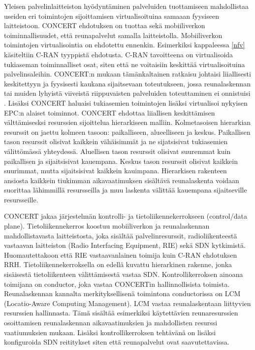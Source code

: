 Yleisen palvelinlaitteiston hyödyntäminen palveluiden tuottamiseen mahdollistaa useiden eri toimintojen sijoittamisen virtualisoituina samaaan fyysiseen laitteistoon.
CONCERT ehdotuksen on tuottaa sekä mobiiliverkon toiminnallisuudet, että reunapalvelut samalla laitteistolla. 
Mobiiliverkon toimintojen virtualisointia on ehdotettu ennenkin. Esimerkiksi kappaleessa \ref{nfv} käsiteltiin C-RAN tyyppistä ehdotusta. C-RAN tavoitteena on virtualisoida tukiaseman toiminnalliset osat, siten että ne voitaisiin keskittää virtualisoituina palvelinsaleihin. 
CONCERT:n mukaan tämänkaltainen ratkaisu johtaisi liiallisesti keskitettyyn ja fyysisesti kaukana sijaitsevaan toteutukseen, jossa reunalaskennan tai muiden lyhyistä viiveistä riippuvaisten palveluiden toteuttaminen ei onnistuisi \cite{liu2014concert}. Lisäksi CONCERT haluaisi tukiasemien toimintojen lisäksi virtualisoi nykyisen EPC:n alaiset toiminnot.
CONCERT ehdottaa liiallisen keskittämisen välttämisesksi resurssien sijoittelua hierarkiseen malliin.
Kolmetasoisen hierarkian resurssit on jaettu kolmeen tasoon: paikalliseen, alueelliseen ja keskus. 
Paikallisen tason resurssit olisivat kaikkein vähäisimmät ja ne sijatsisivat tukiasemien välittömässä yhteydessä.
Aluellisen tason resurssit olisivat suuremmat kuin paikallisen ja sijaitsisivat kauempana.
Keskus tason resurssit olisivat kaikkein suurimmat, mutta sijaitsisivat kaikkein kauimpana. 
Hierarkisen rakenteen ansiosta kaikkein tiukimman aikavaatimuksen sisältävä reunalaskenta voidaan suorittaa lähimmillä resursseilla ja muu laskenta välittää kauempana sijaitseville resursseille.

CONCERT jakaa järjestelmän kontrolli- ja tietoliikennekerrokseen (control/data plane). 
Tietoliikennekerros koostuu mobiiliverkon ja reunalaskennan mahdollistavasta laitteistosta, joka sisältää palvelinresurssit, radioliikenteestä vastaavan laitteiston (Radio Interfacing Equipment, RIE) sekä SDN kytkimistä. Huomautettakoon että RIE vastaavanlainen toimija kuin C-RAN ehdotuksen RRH.
Tietoliikennekerroksella on edellä kuvattu hierarkinen rakenne, jonka sisäisestä tietoliikenteen välittämisestä vastaa SDN.
Kontrollikerroksen ainoana toimijana on conductor, joka vastaa CONCERTin hallinnollisista toimista.
Reunalaskennan kannalta merkityksellisenä toimintona conductorissa on LCM (Locatio-Aware Computing Management).
LCM vastaa reunalaskentaan liittyvien resurssien hallinnasta. Tämä sisältää esimerkiksi käytettävien reunaresurssien osoittamisen reunalaskennan aikavaatimuksien ja mahdollisten resurssi vaatiumuksien mukaan.
Lisäksi kontrollikerroksen tehtävänä on lisäksi konfiguroida SDN reititykset siten että reunapalvelut ovat saavutettavissa.

